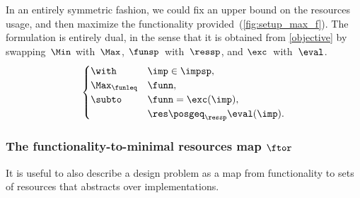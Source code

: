 \begin{remark}
In an entirely symmetric fashion, we could fix an upper bound on
the resources usage, and then maximize the functionality provided~(\cref{fig:setup_max_f}).
The formulation is entirely dual, in the sense that it is obtained
from \eqref{objective} by swapping~$\Min$ with~$\Max$, $\funsp$~with~$\ressp$,
and $\exc$~with~$\eval$.
\begin{equation}
\begin{cases}
\with & \imp\in\impsp,\\
\Max_{\funleq} & \funn,\\
\subto & \funn=\exc(\imp),\\
 & \res\posgeq_{\ressp}\eval(\imp).
\end{cases}\label{eq:objective-1}
\end{equation}
\end{remark}



\subsubsection{The functionality-to-minimal resources map $\ftor$}

It is useful to also describe a design problem as a map from functionality
to sets of resources that abstracts over implementations. 

